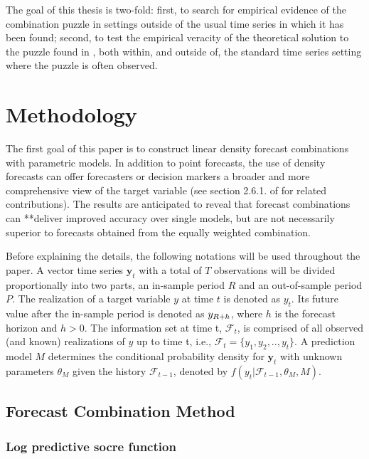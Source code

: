 \documentclass{monashthesis}
\begin{document}
The goal of this thesis is two-fold: first, to search for empirical evidence of the combination puzzle in settings outside of the usual time series in which it has been found; second, to test the empirical veracity of the theoretical solution to the puzzle found in \textcite{FZMP23}, both within, and outside of, the standard time series setting where the puzzle is often observed.

\hypertarget{methodology}{%
\chapter{Methodology}\label{methodology}}

The first goal of this paper is to construct linear density forecast combinations with parametric models. In addition to point forecasts, the use of density forecasts can offer forecasters or decision markers a broader and more comprehensive view of the target variable (see section 2.6.1. of \textcite{FTP22} for related contributions). The results are anticipated to reveal that forecast combinations can **deliver improved accuracy over single models, but are not necessarily superior to forecasts obtained from the equally weighted combination.

Before explaining the details, the following notations will be used throughout the paper. A vector time series \(\textbf{y}_t\) with a total of \(T\) observations will be divided proportionally into two parts, an in-sample period \(R\) and an out-of-sample period \(P\). The realization of a target variable \(y\) at time \(t\) is denoted as \(y_{t}\). Its future value after the in-sample period is denoted as \(y_{\small{R+h}}\), where \(h\) is the forecast horizon and \(h>0\). The information set at time t, \(\mathcal{F}_t\), is comprised of all observed (and known) realizations of \(y\) up to time t, i.e., \(\mathcal{F}_t = \{y_1, y_2, .., y_t\}\). A prediction model \(M\) determines the conditional probability density for \(\textbf{y}_t\) with unknown parameters \(\theta_M\) given the history \(\mathcal{F}_{t-1}\), denoted by \(f(y_t|\mathcal{F}_{t-1}, \theta_M, M)\).

\hypertarget{forecast-combination-method}{%
\section{Forecast Combination Method}\label{forecast-combination-method}}

\hypertarget{log-predictive-socre-function}{%
\subsection{Log predictive socre function}\label{log-predictive-socre-function}}
\end{document}

